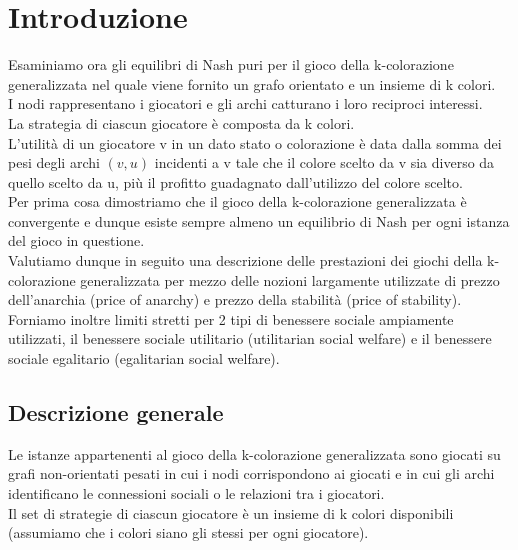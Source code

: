 \chapter{Introduzione}
\justify
Esaminiamo ora gli equilibri di Nash puri per il gioco della k-colorazione generalizzata nel quale viene fornito un grafo orientato e un insieme di k colori.\\

I nodi rappresentano i giocatori e gli archi catturano i loro reciproci interessi.\\

La strategia di ciascun giocatore è composta da k colori.\\

L'utilità di un giocatore v in un dato stato o colorazione è data dalla somma dei pesi degli archi \((v, u)\) incidenti a v tale che il colore scelto da v sia diverso da quello scelto da u, più il profitto guadagnato dall'utilizzo del colore scelto.\\

Per prima cosa dimostriamo che il gioco della k-colorazione generalizzata è convergente e dunque esiste sempre almeno un equilibrio di Nash per ogni istanza del gioco in questione.\\

Valutiamo dunque in seguito una descrizione delle prestazioni dei giochi della k-colorazione generalizzata per mezzo delle nozioni largamente utilizzate di prezzo dell'anarchia (price of anarchy) e prezzo della stabilità (price of stability).\\

Forniamo inoltre limiti stretti per 2 tipi di benessere sociale ampiamente utilizzati, il benessere sociale utilitario (utilitarian social welfare) e il benessere sociale egalitario (egalitarian social welfare).\\

\section{Descrizione generale}
\justify
Le istanze appartenenti al gioco della k-colorazione generalizzata sono giocati su grafi non-orientati pesati in cui i nodi corrispondono ai giocati e in cui gli archi identificano le connessioni sociali o le relazioni tra i giocatori.\\

Il set di strategie di ciascun giocatore è un insieme di k colori disponibili (assumiamo che i colori siano gli stessi per ogni giocatore).\\

